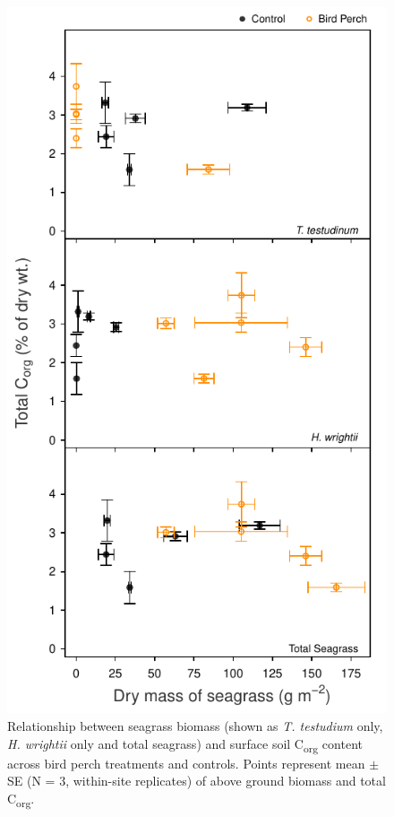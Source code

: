 \begin{figure}
  \centering
  \includegraphics[width=.70\textwidth]{Figures/chapter1/fig9}
\caption[Relationship between seagrass biomass and surface soil C\textsubscript{org} content]{Relationship between seagrass biomass (shown as \textit{T. testudium} only, \textit{H. wrightii} only and total seagrass) and surface soil C\textsubscript{org} content across bird perch treatments and controls. Points represent mean $\pm$ SE (N = 3, within-site replicates) of above ground biomass and total C\textsubscript{org}.}
  \label{fig:1fig9}
\end{figure}

